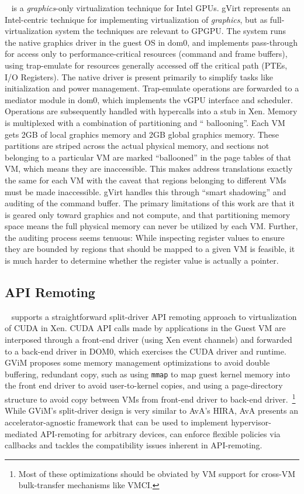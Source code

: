 ~\cite{tian2014full} is a \emph{graphics}-only
virtualization technique for Intel GPUs. gVirt represents an Intel-centric
technique for implementing virtualization of \emph{graphics}, but as
full-virtualization system the techniques are relevant to GPGPU. The system
runs the native graphics driver in the guest OS in dom0, and implements
pass-through for access only to performance-critical resources (command and
frame buffers), using trap-emulate for resources generally accessed off the
critical path (PTEs, I/O Registers). The native driver is present primarily to
simplify tasks like initialization and power management. Trap-emulate
operations are forwarded to a mediator module in dom0, which implements the
vGPU interface and scheduler. Operations are subsequently handled with
hypercalls into a stub in Xen. Memory is multiplexed with a combination of
partitioning and `` ballooning''. Each VM gets 2GB of local graphics memory
and 2GB global graphics memory. These partitions are striped across the actual
physical memory, and sections not belonging to a particular VM are marked
``ballooned'' in the page tables of that VM, which means they are
inaccessible. This makes address translations exactly the same for each VM
with the caveat that regions belonging to different VMs must be made
inaccessible. gVirt handles this through ``smart shadowing'' and auditing of
the command buffer. The primary limitations of this work are that it is geared
only toward graphics and not compute, and that partitioning memory space means
the full physical memory can never be utilized by each VM. Further, the
auditing process seems tenuous: While inspecting register values to ensure
they are bounded by regions that should be mapped to a given VM is feasible,
it is much harder to determine whether the register value is actually a
pointer.

\subsection{API Remoting}

~\cite{gupta2009gvim} supports a straightforward
split-driver API remoting approach to virtualization of CUDA in Xen.
CUDA API calls made by applications in the Guest VM are interposed through a
front-end driver (using Xen event channels) and forwarded to a back-end driver
in DOM0, which exercises the CUDA driver and runtime.
GViM proposes some memory management optimizations to avoid double buffering,
redundant copy, such as using {\tt mmap} to map guest kernel memory into the
front end driver to avoid user-to-kernel copies, and using a page-directory
structure to avoid copy between VMs from front-end driver to back-end driver.~\footnote{Most of these optimizations should be obviated by VM support for
cross-VM bulk-transfer mechanisms like VMCI.} While GViM's
split-driver design is very similar to AvA's HIRA, AvA presents an
accelerator-agnostic framework that can be used to implement
hypervisor-mediated API-remoting for arbitrary devices, can enforce flexible
policies via callbacks and tackles the compatibility issues inherent in
API-remoting.

